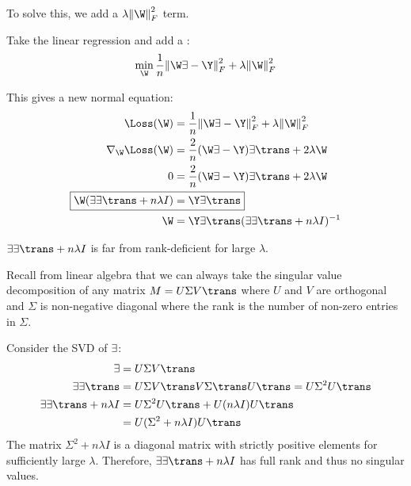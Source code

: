 \documentclass[class=cs480,notes,tikz]{agony}
\begin{document}
To solve this, we add a $\lambda\norm{\W}_F^2$ term.

\begin{defn}
  Take the linear regression and add a :
  \[ \min_{\W} \frac1n\norm{\W\X-\Y}^2_F + \lambda\norm{\W}^2_F \]
\end{defn}

This gives a new normal equation:
\begin{align*}
  \Loss(\W)                           & = \frac1n\norm{\W\X-\Y}^2_F + \lambda\norm{\W}^2_F \\
  \nabla_{\W}\Loss(\W)                & = \frac2n(\W\X-\Y)\X\trans + 2\lambda\W            \\
  0                                   & = \frac2n(\W\X-\Y)\X\trans + 2\lambda\W            \\
  \Aboxed{\W(\X\X\trans + n\lambda I) & = \Y\X\trans}                                      \\
  \W                                  & = \Y\X\trans(\X\X\trans + n\lambda I)^{-1}
\end{align*}

\begin{prop}
  $\X\X\trans + n\lambda I$ is far from rank-deficient for large $\lambda$.
\end{prop}
\begin{prf}
  Recall from linear algebra that we can always take the singular value decomposition
  of any matrix $M = U\Sigma V\trans$ where $U$ and $V$ are orthogonal
  and $\Sigma$ is non-negative diagonal where the rank is the number of non-zero
  entries in $\Sigma$.

  Consider the SVD of $\exists\!\,$:
  \begin{align*}
    \X                      & = U\Sigma V\trans                                           \\
    \X\X\trans              & = U\Sigma V\trans V \Sigma\trans U\trans = U\Sigma^2U\trans \\
    \X\X\trans + n\lambda I & = U\Sigma^2U\trans + U(n\lambda I)U\trans                   \\
                            & = U(\Sigma^2 + n\lambda I)U\trans
  \end{align*}
  The matrix $\Sigma^2 + n\lambda I$ is a diagonal matrix with
  strictly positive elements for sufficiently large $\lambda$.
  Therefore, $\X\X\trans + n\lambda I$ has full rank and thus no singular values.
\end{prf}
\end{document}
